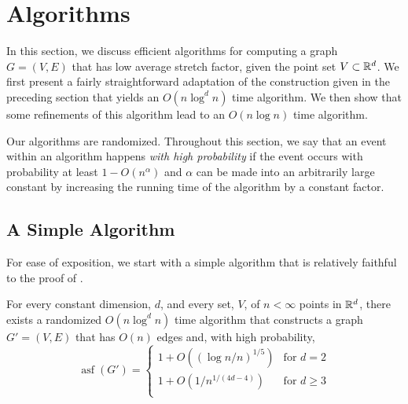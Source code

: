 \documentclass{patmorin}
\DeclareMathOperator{\asf}{asf}
\begin{document}
\section{Algorithms}

In this section, we discuss efficient algorithms for computing a graph
$G=(V,E)$ that has low average stretch factor, given the point set
$V\subset\mathbb{R}^d$.  We first present a fairly straightforward adaptation of
the construction given in the preceding section that yields an $O(n\log^d
n)$ time algorithm.  We then show that some refinements of this algorithm
lead to an $O(n\log n)$ time algorithm.

Our algorithms are randomized.  Throughout this section, we say that an
event within an algorithm happens \emph{with high probability} if the
event occurs with probability at least $1-O(n^{\alpha})$ and $\alpha$
can be made into an arbitrarily large constant by increasing the running
time of the algorithm by a constant factor.

\subsection{A Simple Algorithm}

For ease of exposition, we start with a simple algorithm that is
relatively faithful to the proof of .  
\begin{thm}
  For every constant dimension, $d$, and every set, $V$, of $n<\infty$
  points in $\mathbb{R}^d$, there exists a randomized $O(n\log^{d} n )$ time
  algorithm that constructs a graph $G'=(V,E)$ that has $O(n)$ edges and,
  with high probability, 
  \[
      \asf(G')=\begin{cases}
         1+ O((\log n/n)^{1/5}) & \text{for $d=2$} \\
         1+ O(1/n^{1/(4d-4)}) & \text{for $d\ge 3$} \\
      \end{cases}
  \]
\end{thm}
\end{document}
